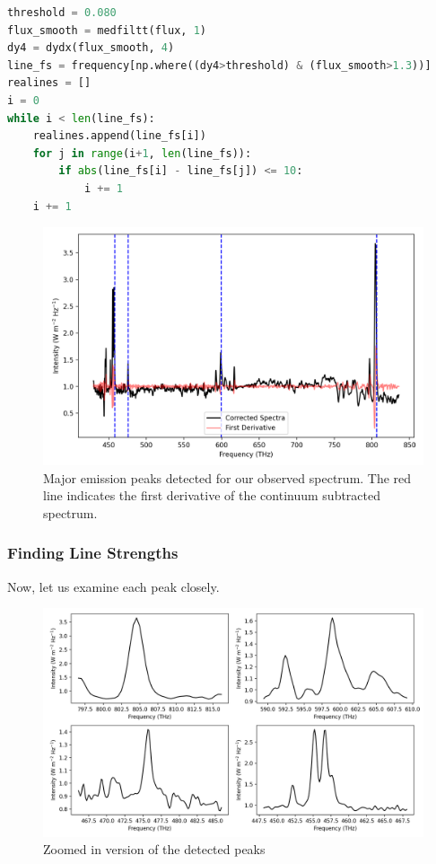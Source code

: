 \begin{lstlisting}[language=Python, caption=Finding the peaks using a threshold value set manually]
threshold = 0.080
flux_smooth = medfiltt(flux, 1)
dy4 = dydx(flux_smooth, 4)
line_fs = frequency[np.where((dy4>threshold) & (flux_smooth>1.3))]
realines = []
i = 0
while i < len(line_fs):
    realines.append(line_fs[i])
    for j in range(i+1, len(line_fs)):
        if abs(line_fs[i] - line_fs[j]) <= 10:
            i += 1
    i += 1
\end{lstlisting}

\begin{figure}[H]
    \centering
    \includegraphics[width=0.7\linewidth]{Figures/3/peaks.png}
    \caption{Major emission peaks detected for our observed spectrum. The red line indicates the first derivative of the continuum subtracted spectrum.}
\end{figure}

\subsubsection{Finding Line Strengths}

Now, let us examine each peak closely.

\begin{figure}[H]
    \centering
    \includegraphics[width=0.7\linewidth]{Figures/3/peaks_zoom.png}
    \caption{Zoomed in version of the detected peaks}
\end{figure}

